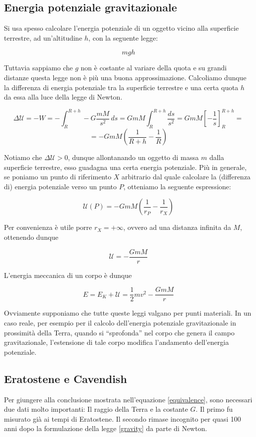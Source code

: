 \subsection{Energia potenziale gravitazionale}
Si usa spesso calcolare l'energia potenziale di un oggetto vicino alla superficie
terrestre, ad un'altitudine $h$, con la seguente legge:

\[ mgh \]

\noindent Tuttavia sappiamo che $g$ non è costante al variare della quota e su grandi
distanze questa legge non è più una buona approssimazione. Calcoliamo dunque la differenza
di energia potenziale tra la superficie terrestre e una certa quota $h$ da essa alla luce
della legge di Newton.

\[ \Delta\mathcal{U} = -W = -\int_{R}^{R + h}-G\frac{mM}{s^2}\,ds = GmM\int_{R}^{R+h}\frac{ds}{s^2} = GmM\left[ -\frac{1}{s} \right]_{R}^{R+h} =  \]
\[ = -GmM\left( \frac{1}{R + h} - \frac{1}{R} \right) \]

\noindent Notiamo che $\Delta\mathcal{U} > 0$, dunque allontanando un oggetto di massa
$m$ dalla superficie terrestre, esso guadagna una certa energia potenziale. Più in generale,
se poniamo un punto di riferimento $X$ arbitrario dal quale calcolare la (differenza di)
energia potenziale verso un punto $P$, otteniamo la seguente espressione:

\[ \mathcal{U}(P) = -GmM\left(\frac{1}{r_P} - \frac{1}{r_X}\right) \]

\noindent Per convenienza è utile porre $r_X = +\infty$, ovvero ad una distanza infinita da
$M$, ottenendo dunque

\[ \mathcal{U} = -\frac{GmM}{r} \]

\noindent L'energia meccanica di un corpo è dunque

\[ E = E_K + \mathcal{U} = \frac{1}{2}mv^2 -\frac{GmM}{r} \]

\noindent Ovviamente supponiamo che tutte queste leggi valgano per punti materiali.
In un caso reale, per esempio per il calcolo dell'energia potenziale gravitazionale
in prossimità della Terra, quando si ``sprofonda'' nel corpo che genera il campo
gravitazionale, l'estensione di tale corpo modifica l'andamento dell'energia potenziale.

\subsection{Eratostene e Cavendish}
Per giungere alla conclusione mostrata nell'equazione \ref{equivalence},
sono necessari due dati molto importanti: Il raggio della Terra e la
costante $G$. Il primo fu misurato già ai tempi di Eratostene. Il secondo
rimase incognito per quasi 100 anni dopo la formulazione della legge
\ref{gravity} da parte di Newton.

